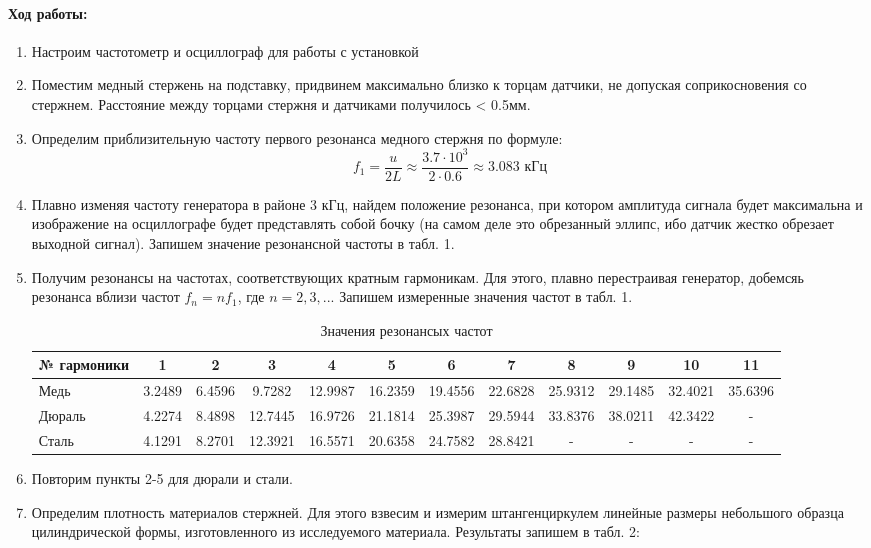 \documentclass[a4paper, 10pt]{article}%
\begin{document}
	\paragraph{Ход работы:}
	\begin{enumerate}
		\item Настроим частотометр и осциллограф для работы с установкой
		\item Поместим медный стержень на подставку, придвинем максимально близко к торцам датчики, не допуская соприкосновения со стержнем. Расстояние между торцами стержня и датчиками получилось < 0.5мм.
		\item Определим приблизительную частоту первого резонанса медного стержня по формуле:
		\[f_1 = \dfrac{u}{2L} \approx \dfrac{3.7 \cdot 10^3}{2 \cdot 0.6} \approx 3.083 \text{ кГц}\]
		\item Плавно изменяя частоту генератора в районе 3 кГц, найдем положение резонанса, при котором амплитуда сигнала будет максимальна и изображение на осциллографе будет представлять собой бочку (на самом деле это обрезанный эллипс, ибо датчик жестко обрезает выходной сигнал). Запишем значение резонансной частоты в табл. 1.
		\item Получим резонансы на частотах, соответствующих кратным гармоникам. Для этого, плавно перестраивая генератор, добемсяь резонанса вблизи частот $f_n = nf_1$, где $n = 2, 3, ...$ Запишем измеренные значения частот в табл. 1.
		\begin{table}[h]
			\centering
			\caption{Значения резонансых частот}
			\begin{tabular}{|l||c|c|c|c|c|c|c|c|c|c|c|}
				\hline
				№ гармоники & 1 & 2 & 3 & 4 & 5 & 6 & 7 & 8 & 9 & 10 & 11 \\
				\hline
				Медь   & 3.2489 & 6.4596 &  9.7282 & 12.9987 & 16.2359 & 19.4556 & 22.6828 & 25.9312 & 29.1485 & 32.4021 & 35.6396 \\
				\hline
				Дюраль & 4.2274 & 8.4898 & 12.7445 & 16.9726 & 21.1814 & 25.3987 & 29.5944 & 33.8376 & 38.0211 & 42.3422  & - \\
				\hline
				Сталь  & 4.1291 & 8.2701 & 12.3921 & 16.5571 & 20.6358 & 24.7582 & 28.8421 & - & - & - & - \\
				\hline
			\end{tabular}
		\end{table}
		\item Повторим пункты 2-5 для дюрали и стали.
		\item Определим плотность материалов стержней. Для этого взвесим и измерим штангенциркулем линейные размеры небольшого образца цилиндрической формы, изготовленного из исследуемого материала. Результаты запишем в табл. 2:

\end{enumerate}
\end{document}
